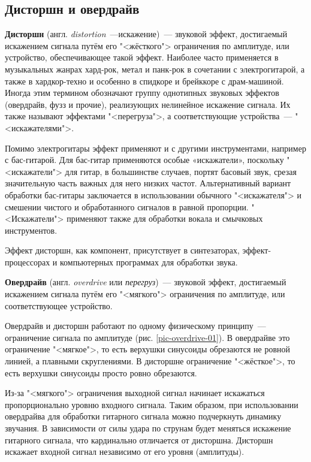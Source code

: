 \documentclass[oneside, final, 14pt]{extreport}
\begin{document}
\subsection{Дисторшн и овердрайв}
\textbf{Дисторшн} (англ. \textit{distortion}~---искажение)~--- звуковой эффект, достигаемый искажением сигнала путём его "<жёсткого"> ограничения по амплитуде, или устройство, обеспечивающее такой эффект. Наиболее часто применяется в музыкальных жанрах хард-рок, метал и панк-рок в сочетании с электрогитарой, а также в хардкор-техно и особенно в спидкоре и брейккоре с драм-машиной. Иногда этим термином обозначают группу однотипных звуковых эффектов (овердрайв, фузз и прочие), реализующих нелинейное искажение сигнала. Их также называют эффектами "<перегруза">, а соответствующие устройства~--- "<искажателями">.

Помимо электрогитары эффект применяют и с другими инструментами, например с бас-гитарой. Для бас-гитар применяются особые «искажатели», поскольку "<искажатели"> для гитар, в большинстве случаев, портят басовый звук, срезая значительную часть важных для него низких частот. Альтернативный вариант обработки бас-гитары заключается в использовании обычного "<искажателя"> и смешении чистого и обработанного сигналов в равной пропорции. "<Искажатели"> применяют также для обработки вокала и смычковых инструментов.

Эффект дисторшн, как компонент, присутствует в синтезаторах, эффект-процессорах и компьютерных программах для обработки звука.

\textbf{Овердрайв} (англ. \textit{overdrive} или \textit{перегруз})~--- звуковой эффект, достигаемый искажением сигнала путём его "<мягкого"> ограничения по амплитуде, или соответствующее устройство.

Овердрайв и дисторшн работают по одному физическому принципу~--- ограничение сигнала по амплитуде (рис. \ref{pic-overdrive-01}). В овердрайве это ограничение "<мягкое">, то есть верхушки синусоиды обрезаются не ровной линией, а плавными скруглениями. В дисторшне ограничение "<жёсткое">, то есть верхушки синусоиды просто ровно обрезаются.

Из-за "<мягкого"> ограничения выходной сигнал начинает искажаться пропорционально уровню входного сигнала. Таким образом, при использовании овердрайва для обработки гитарного сигнала можно подчеркнуть динамику звучания. В зависимости от силы удара по струнам будет меняться искажение гитарного сигнала, что кардинально отличается от дисторшна. Дисторшн искажает входной сигнал независимо от его уровня (амплитуды).
\end{document}
